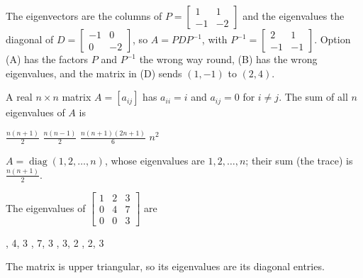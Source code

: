 \begin{question}[id=gate-in2006-1, source=GATE IN 2006, marks=2]
\begin{solution}
The eigenvectors are the columns of $P = \begin{bmatrix} 1 & 1 \\ -1 & -2 \end{bmatrix}$ and the eigenvalues the diagonal of $D = \begin{bmatrix} -1 & 0 \\ 0 & -2 \end{bmatrix}$, so $A = PDP^{-1}$, with $P^{-1} = \begin{bmatrix} 2 & 1 \\ -1 & -1 \end{bmatrix}$. Option (A) has the factors $P$ and $P^{-1}$ the wrong way round, (B) has the wrong eigenvalues, and the matrix in (D) sends $(1, -1)$ to $(2, 4)$.
\end{solution}
\end{question}

\begin{question}[id=gate-in2010-1, source=GATE IN 2010]
A real $n \times n$ matrix $A = [a_{ij}]$ has $a_{ii} = i$ and $a_{ij} = 0$ for $i \ne j$. The sum of all $n$ eigenvalues of $A$ is
\begin{options}
  \correct $\frac{n(n + 1)}{2}$
  \option $\frac{n(n - 1)}{2}$
  \option $\frac{n(n + 1)(2n + 1)}{6}$
  \option $n^2$
\end{options}
\begin{solution}
$A = \operatorname{diag}(1, 2, \dots, n)$, whose eigenvalues are $1, 2, \dots, n$; their sum (the trace) is $\frac{n(n + 1)}{2}$.
\end{solution}
\end{question}

\begin{question}[id=gate-cs2011-1, source=GATE CS 2011]
The eigenvalues of $\begin{bmatrix} 1 & 2 & 3 \\ 0 & 4 & 7 \\ 0 & 0 & 3 \end{bmatrix}$ are
\begin{options}
  , 4, 3
  , 7, 3
  , 3, 2
  , 2, 3
\end{options}
\begin{solution}
The matrix is upper triangular, so its eigenvalues are its diagonal entries.
\end{solution}
\end{question}

